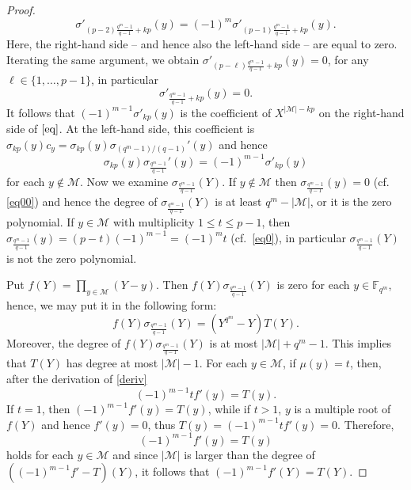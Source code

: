 \documentclass[12pt]{article}
\newcommand{\cM}{{\mathcal M}}
\newcommand{\F}{{\mathbb F}}
\begin{document}
\begin{proof}
	\[\sigma'_{(p-2)\frac{q^m-1}{q-1}+kp}(y)=(-1)^m\sigma'_{(p-1)\frac{q^{m}-1}{q-1}+kp}(y).\]
	Here, the right-hand side -- and hence also the left-hand side -- are equal to zero. Iterating the same argument, we obtain $\sigma'_{(p-\ell)\frac{q^m-1}{q-1}+kp}(y)=0$, 
	for any $\ell \in \{1,\ldots,p-1\}$, in particular 
	\[\sigma'_{\frac{q^m-1}{q-1}+kp}(y)=0.\]
	It follows that $(-1)^{m-1}\sigma'_{kp}(y)$ is the coefficient of $X^{|\cM|-kp}$ on the right-hand side of $\eqref{eq}$. At the left-hand side, this coefficient is $\sigma_{kp}(y)c_y=\sigma_{kp}(y)\sigma_{(q^{m}-1)/(q-1)}'(y)$ and hence 
	\begin{equation}
		\label{kell}
		\sigma_{kp}(y)\sigma_{\frac{q^m-1}{q-1}}'(y)=(-1)^{m-1}\sigma'_{kp}(y)
	\end{equation}
	for each $y\notin \cM$. Now we examine $\sigma_{\frac{q^{m}-1}{q-1}}(Y)$. If $y\notin \cM$ then $\sigma_{\frac{q^{m}-1}{q-1}}(y)=0$ (cf. \eqref{eq00}) and hence the degree of $\sigma_{\frac{q^{m}-1}{q-1}}(Y)$ is at least $q^m-|\cM|$, or it is the zero polynomial. 
	If $y\in \cM$ with multiplicity $1\leq t \leq p-1$, then $\sigma_{\frac{q^{m}-1}{q-1}}(y)=(p-t)(-1)^{m-1}=(-1)^mt$ (cf.\ \eqref{eq0}), in particular $\sigma_{\frac{q^{m}-1}{q-1}}(Y)$ is not the zero polynomial.
	
	Put $f(Y)=\prod_{y\in \cM}(Y-y)$. Then  $f(Y)\sigma_{\frac{q^m-1}{q-1}}(Y)$ is zero for each $y\in \F_{q^m}$,  hence, we may put it in the following form:
	\begin{equation}
		\label{deriv}
		f(Y)\sigma_{\frac{q^m-1}{q-1}}(Y)=(Y^{q^m}-Y)T(Y).
	\end{equation}
	Moreover, the degree of $f(Y)\sigma_{\frac{q^m-1}{q-1}}(Y)$ is at most $| \cM| + q^m-1$. This implies that $T(Y)$ has degree at most $|\cM|-1$. For each $y\in \cM$, if $\mu(y)=t$, then, after the derivation of \eqref{deriv}
	\[(-1)^{m-1}t f'(y)=T(y).\]
	If $t=1$, then $(-1)^{m-1}f'(y)=T(y)$, while if $t >1$, $y$ is a multiple root of $f(Y)$ and hence $f'(y)=0$, thus $T(y)=(-1)^{m-1}tf'(y)=0$. Therefore,
	\[(-1)^{m-1}f'(y)=T(y)\]
	holds for each $y \in \cM$ and since $|\cM|$ is larger than the degree of $((-1)^{m-1}f'-T)(Y)$, it follows that $(-1)^{m-1}f'(Y)=T(Y)$.
	

\end{proof}
\end{document}
